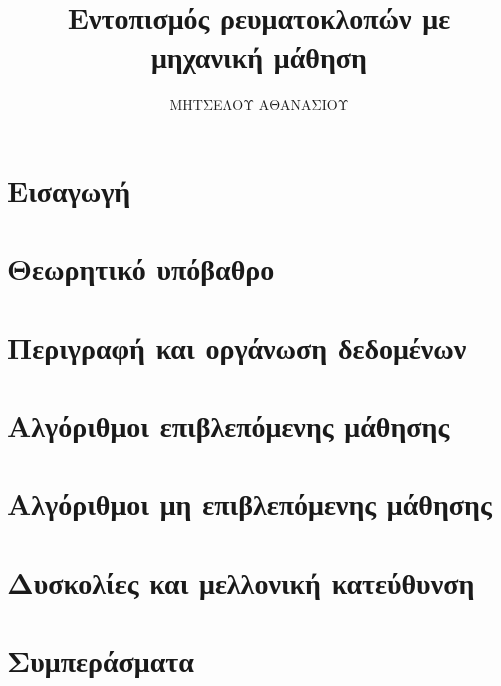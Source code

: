 \documentclass[11pt,a4paper,english,greek,twoside]{dblab-thesis}
\title{Εντοπισμός ρευματοκλοπών με μηχανική μάθηση}
\author{ΜΗΤΣΕΛΟΥ ΑΘΑΝΑΣΙΟΥ}
\begin{document}
\maketitle

\frontmatter
{}
\mainmatter

\tableofcontents
\listoffigures
\listoftables
\chapter{Εισαγωγή}


\chapter{Θεωρητικό υπόβαθρο}


\chapter{Περιγραφή και οργάνωση δεδομένων}


\chapter{Αλγόριθμοι επιβλεπόμενης μάθησης}


\chapter{Αλγόριθμοι μη επιβλεπόμενης μάθησης}


\chapter{Δυσκολίες και μελλονική κατεύθυνση}


\chapter{Συμπεράσματα}



%

\nocite{*}



\appendix


%



\backmatter
\printindex
\end{document}
